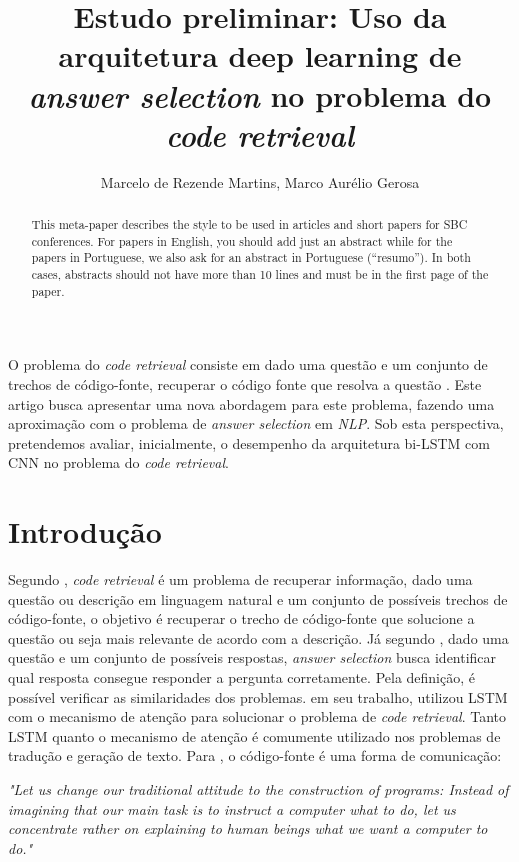 \documentclass[12pt]{article}
\title{Estudo preliminar: Uso da arquitetura deep learning de \textit{answer selection} no problema do \textit{code retrieval}}
\author{Marcelo de Rezende Martins\inst{1}, Marco Aurélio Gerosa\inst{2}}
\begin{document}
 

\maketitle

\begin{abstract}
  This meta-paper describes the style to be used in articles and short papers
  for SBC conferences. For papers in English, you should add just an abstract
  while for the papers in Portuguese, we also ask for an abstract in
  Portuguese (``resumo''). In both cases, abstracts should not have more than
  10 lines and must be in the first page of the paper.
\end{abstract}
     
\begin{resumo} 
  O problema do \textit{code retrieval} consiste em dado uma questão e um conjunto de trechos de código-fonte, recuperar o código fonte que resolva a questão . Este artigo busca apresentar uma nova abordagem para este problema, fazendo uma aproximação com o problema de \textit{answer selection} em \emph{NLP}. Sob esta perspectiva, pretendemos avaliar, inicialmente, o desempenho da arquitetura bi-LSTM com CNN no problema do \textit{code retrieval}. 
\end{resumo}


\section{Introdução}

Segundo \cite{Allamanis-bimodal-source-code-natural-language:2015}, \textit{code retrieval} é um problema de recuperar informação, 
dado uma questão ou descrição em linguagem natural e um conjunto de possíveis trechos de código-fonte, o objetivo é recuperar o 
trecho de código-fonte que solucione a questão ou seja mais relevante de acordo com a descrição. Já segundo \cite{lai-etal-2018-review},
dado uma questão e um conjunto de possíveis respostas, \textit{answer selection} busca identificar qual resposta consegue responder a 
pergunta corretamente. Pela definição, é possível verificar as similaridades dos problemas. \cite{iyer-etal-2016-summarizing} em seu trabalho, utilizou LSTM com o mecanismo de atenção para solucionar
o problema de \textit{code retrieval}. Tanto LSTM quanto o mecanismo de atenção é comumente utilizado nos problemas de tradução e geração de texto. Para \cite{Knuth:1984:LP}, 
o código-fonte é uma forma de comunicação:

\textit{"Let us change our traditional attitude to the construction of programs: Instead of imagining that our
main task is to instruct a computer what to do, let us
concentrate rather on explaining to human beings what
we want a computer to do."}
\end{document}
